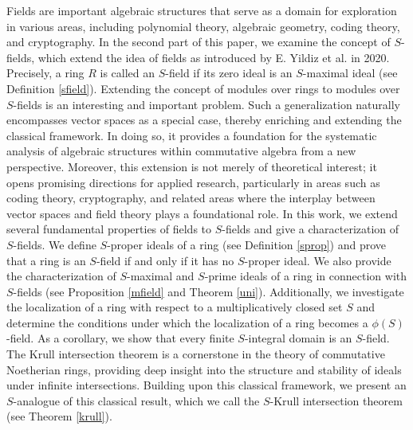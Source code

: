 \documentclass[11pt]{article}
\begin{document}
	Fields are important algebraic structures that serve as a domain for exploration in various areas, including polynomial theory, algebraic geometry, coding theory, and cryptography. In the second part of this paper, we examine the concept of $S$-fields, which extend the idea of fields as introduced by E. Yildiz et al. \cite{ed20} in 2020. Precisely, a ring $R$ is called an $S$-field if its zero ideal is an $S$-maximal ideal (see Definition \ref{sfield}).  Extending the concept of modules over rings to modules over $S$-fields is an interesting and important problem. Such a generalization naturally encompasses vector spaces as a special case, thereby enriching and extending the classical framework. In doing so, it provides a foundation for the systematic analysis of algebraic structures within commutative algebra from a new perspective. Moreover, this extension is not merely of theoretical interest; it opens promising directions for applied research, particularly in areas such as coding theory, cryptography, and related areas where the interplay between vector spaces and field theory plays a foundational role.    
    In this work, we extend several fundamental properties of fields to $S$-fields and give a characterization of $S$-fields. We define $S$-proper ideals of a ring (see Definition \ref{sprop}) and prove that a ring is an $S$-field if and only if it has no $S$-proper ideal. We also provide the characterization of $S$-maximal and $S$-prime ideals of a ring in connection with $S$-fields (see Proposition \ref{mfield} and  Theorem \ref{uni}). Additionally, we investigate the localization of a ring with respect to a multiplicatively closed set $S$ and determine the conditions under which the localization of a ring becomes a $\phi(S)$-field. As a corollary, we show that every finite $S$-integral domain is an $S$-field. 
	The Krull intersection theorem is a cornerstone in the theory of commutative Noetherian rings, providing deep insight into the structure and stability of ideals under infinite intersections. Building upon this classical framework, we present an $S$-analogue of this classical result, which we call the $S$-Krull intersection theorem (see Theorem \ref{krull}).
	
	
\end{document}
